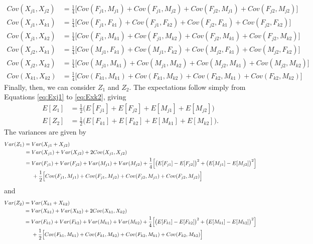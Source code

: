 \documentclass{article}
\begin{document}
\begin{align}
  Cov(X_{j1}, X_{j2}) & = \frac{1}{4} \Big [ Cov(F_{j1}, M_{j1}) + Cov(F_{j1}, M_{j2}) + Cov(F_{j2}, M_{j1}) + Cov(F_{j2}, M_{j2}) \Big ] \label{eq:covj1j2} \\
  Cov(X_{j1}, X_{k1}) & = \frac{1}{4} \Big [ Cov(F_{j1}, F_{k1}) + Cov(F_{j1}, F_{k2}) + Cov(F_{j2}, F_{k1}) + Cov(F_{j2}, F_{k2}) \Big ] \label{eq:covj1k1} \\
  Cov(X_{j1}, X_{k2}) & = \frac{1}{4} \Big [ Cov(F_{j1}, M_{k1}) + Cov(F_{j1}, M_{k2}) + Cov(F_{j2}, M_{k1}) + Cov(F_{j2}, M_{k2}) \Big ] \label{eq:covj1k2} \\
  Cov(X_{j2}, X_{k1}) & = \frac{1}{4} \Big [ Cov(M_{j1}, F_{k1}) + Cov(M_{j1}, F_{k2}) + Cov(M_{j2}, F_{k1}) + Cov(M_{j2}, F_{k2}) \Big ] \label{eq:covj2k1} \\
  Cov(X_{j2}, X_{k2}) & = \frac{1}{4} \Big [ Cov(M_{j1}, M_{k1}) + Cov(M_{j1}, M_{k2}) + Cov(M_{j2}, M_{k1}) + Cov(M_{j2}, M_{k2}) \Big ] \label{eq:covj2k1} \\
  Cov(X_{k1}, X_{k2}) & = \frac{1}{4} \Big [ Cov(F_{k1}, M_{k1}) + Cov(F_{k1}, M_{k2}) + Cov(F_{k2}, M_{k1}) + Cov(F_{k2}, M_{k2}) \Big ] \label{eq:covk2k1} 
\end{align}
Finally, then, we can consider $Z_1$ and $Z_2$. The expectations follow simply from Equations \ref{eq:Exj1} to \ref{eq:Exk2}, giving
\begin{align}
  E[Z_1] & = \frac{1}{2} \Big ( E[F_{j1}] + E[F_{j2}] + E[M_{j1}] + E[M_{j2}] \Big ) \label{eq:Ez1} \\
  E[Z_2] & = \frac{1}{2} \Big ( E[F_{k1}] + E[F_{k2}] + E[M_{k1}] + E[M_{k2}] \Big ). \label{eq:Ez2}
\end{align}
The variances are given by
\begin{align*}
  Var(Z_1) & = Var(X_{j1} + X_{j2}) \\
           & = Var(X_{j1}) + Var(X_{j2}) + 2 Cov(X_{j1}, X_{j2}) \\
           & = Var(F_{j1}) + Var(F_{j2}) + Var(M_{j1}) + Var(M_{j2}) + \frac{1}{4} \Big [ \big ( E[F_{j1}] - E[F_{j2}] \big )^2 + \big ( E[M_{j1}] - E[M_{j2}] \big )^2 \Big ] \\
  & \hspace{0.5cm} + \frac{1}{2} \Big [ Cov(F_{j1}, M_{j1}) + Cov(F_{j1}, M_{j2}) + Cov(F_{j2}, M_{j1}) + Cov(F_{j2}, M_{j2}) \Big ]
\end{align*}
and
\begin{align*}
  Var(Z_2) & = Var(X_{k1} + X_{k2}) \\
           & = Var(X_{k1}) + Var(X_{k2}) + 2 Cov(X_{k1}, X_{k2}) \\
           & = Var(F_{k1}) + Var(F_{k2}) + Var(M_{k1}) + Var(M_{k2}) + \frac{1}{4} \Big [ \big ( E[F_{k1}] - E[F_{k2}] \big )^2 + \big ( E[M_{k1}] - E[M_{k2}] \big )^2 \Big ] \\
  & \hspace{0.5cm} + \frac{1}{2} \Big [ Cov(F_{k1}, M_{k1}) + Cov(F_{k1}, M_{k2}) + Cov(F_{k2}, M_{k1}) + Cov(F_{k2}, M_{k2}) \Big ]
\end{align*}
\end{document}
